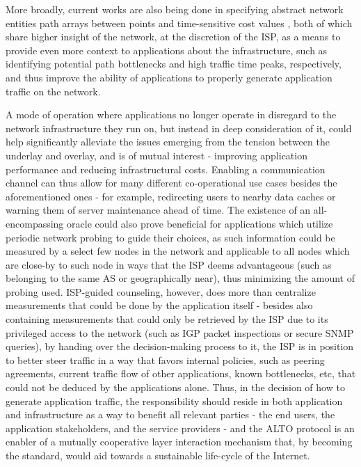      More broadly, current works are also being done in specifying abstract network entities path arrays between points \cite{alto-path-vector(draft)} and time-sensitive cost values \cite{alto-calendar-cost-map(draft)}, both of which share higher insight of the network, at the discretion of the ISP, as a means to provide even more context to applications about the infrastructure, such as identifying potential path bottlenecks and high traffic time peaks, respectively, and thus improve the ability of applications to properly generate application traffic on the network.

    A mode of operation where applications no longer operate in disregard to the network infrastructure they run on, but instead in deep consideration of it, could help significantly alleviate the issues emerging from the tension between the underlay and overlay, and is of mutual interest - improving application performance and reducing infrastructural costs.
    Enabling a communication channel can thus allow for many different co-operational use cases besides the aforementioned ones - for example, redirecting users to nearby data caches or warning them of server maintenance ahead of time.
    The existence of an all-encompassing oracle could also prove beneficial for applications which utilize periodic network probing to guide their choices, as such information could be measured by a select few nodes in the network and applicable to all nodes which are close-by to such node in ways that the ISP deems advantageous (such as belonging to the same AS or geographically near), thus minimizing the amount of probing used.
    ISP-guided counseling, however, does more than centralize measurements that could be done by the application itself - besides also containing measurements that could only be retrieved by the ISP due to its privileged access to the network (such as IGP packet inspections or secure SNMP queries), by handing over the decision-making process to it, the ISP is in position to better steer traffic in a way that favors internal policies, such as peering agreements, current traffic flow of other applications, known bottlenecks, etc, that could not be deduced by the applications alone.
    Thus, in the decision of how to generate application traffic, the responsibility should reside in both application and infrastructure as a way to benefit all relevant parties - the end users, the application stakeholders, and the service providers - and the ALTO protocol is an enabler of a mutually cooperative layer interaction mechanism that, by becoming the standard, would aid towards a sustainable life-cycle of the Internet.

